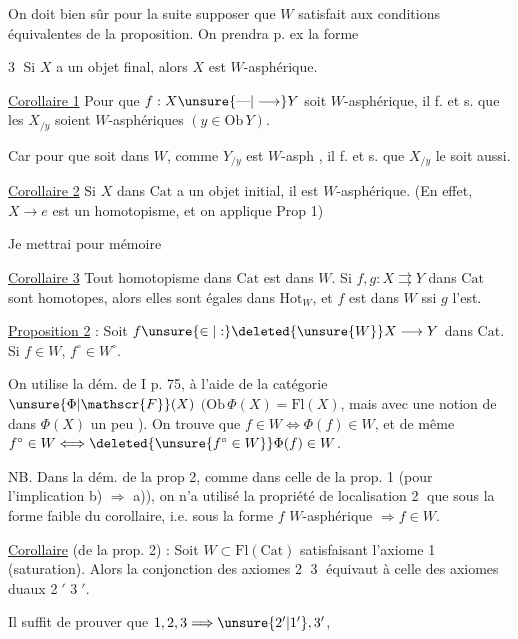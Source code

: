 
On doit bien sûr pour la suite supposer que $W$ satisfait aux conditions équivalentes de la proposition. On prendra p. ex la forme


\textcircled{3} Si $X$ a un objet final, alors $X$ est $W$-asphérique.

\uline{Corollaire 1} Pour que $f:X\unsure{\text{---}|\longrightarrow}Y$ soit $W$-asphérique, il f. et s. que les $X_{/y}$ soient $W$-asphériques $(y\in\mathrm{Ob}\,Y)$.

Car pour que
soit dans $W$, comme $Y_{/y}$ est $W$-asph , il f. et s. que $X_{/y}$ le soit aussi.

 \uline{Corollaire 2} Si $X$ dans $\mathrm{Cat}$ a un objet initial, il est $W$-asphérique. (En effet, $X\longrightarrow e$ est un homotopisme, et on applique Prop 1)


Je mettrai pour mémoire

\uline{Corollaire 3} Tout homotopisme dans $\mathrm{Cat}$ est dans $W$. Si $f,g:X\rightrightarrows Y$  dans $\mathrm{Cat}$ sont homotopes, alors elles sont égales dans $\mathrm{Hot}_W$, et $f$ est dans $W$ ssi $g$ l'est.

\uline{Proposition 2} : Soit $f\unsure{\in|:}\deleted{\unsure{W}}X\longrightarrow Y$ dans $\mathrm{Cat}$. Si $f\in W$, $f^\circ\in W^\circ$.

On utilise la dém. de I p. 75, à l'aide de la catégorie  $\unsure{\Phi|\mathscr{F}}(X)$ $(\mathrm{Ob}\,\Phi(X)=\mathrm{Fl}(X)$, mais avec une notion de  dans $\Phi(X)$ un peu ). On trouve que $f\in W\Longleftrightarrow\Phi(f)\in W$, et de même $f^\circ\in W\Longleftrightarrow\deleted{\unsure{f^\circ\in W}}\Phi(f)\in W$.

NB. Dans la dém. de la prop 2, comme dans celle de la prop. 1 (pour l'implication b) $\Rightarrow$ a)), on n'a utilisé la propriété de localisation \textcircled{2} que sous la forme faible du corollaire, i.e.  sous la forme $f$ $W$-asphérique $\Rightarrow f\in W$.


\uline{Corollaire} (de la prop. 2) : Soit $W\subset\mathrm{Fl}(\mathrm{Cat})$ satisfaisant l'axiome \textcircled{1} (saturation). Alors la conjonction des axiomes \textcircled{2} \textcircled{3} équivaut à celle des axiomes duaux \textcircled{2$'$} \textcircled{3$'$}.

Il suffit de prouver que $1,2,3\Longrightarrow\unsure{2'|1'},3'$,

